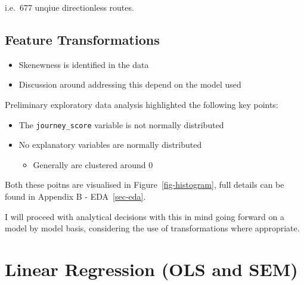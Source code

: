 \documentclass[
  number]{elsarticle}
\providecommand{\tightlist}{%
  \setlength{\itemsep}{0pt}\setlength{\parskip}{0pt}}
\begin{document}
i.e.~677 unqiue directionless routes.

\subsection{Feature Transformations}\label{sec-feature-transformations}

\begin{tcolorbox}[enhanced jigsaw, colframe=quarto-callout-tip-color-frame, opacityback=0, breakable, toptitle=1mm, titlerule=0mm, coltitle=black, colback=white, bottomtitle=1mm, left=2mm, arc=.35mm, leftrule=.75mm, opacitybacktitle=0.6, bottomrule=.15mm, colbacktitle=quarto-callout-tip-color!10!white, title=\textcolor{quarto-callout-tip-color}{\faLightbulb}\hspace{0.5em}{Subsection Summary}, rightrule=.15mm, toprule=.15mm]

\begin{itemize}
\tightlist
\item
  Skenewness is identified in the data
\item
  Discussion around addressing this depend on the model used
\end{itemize}

\end{tcolorbox}

Preliminary exploratory data analysis highlighted the following key
points:

\begin{itemize}
\tightlist
\item
  The \texttt{\textquotesingle{}journey\_score\textquotesingle{}}
  variable is not normally distributed
\item
  No explanatory variables are normally distributed

  \begin{itemize}
  \tightlist
  \item
    Generally are clustered around 0
  \end{itemize}
\end{itemize}

Both these poitns are visualised in Figure~\ref{fig-histogram}, full
details can be found in Appendix B - EDA~\ref{sec-eda}.

I will proceed with analytical decisions with this in mind going forward
on a model by model basis, considering the use of transformations where
appropriate.

\section{Linear Regression (OLS and SEM)}\label{sec-linear-regression}
\end{document}
